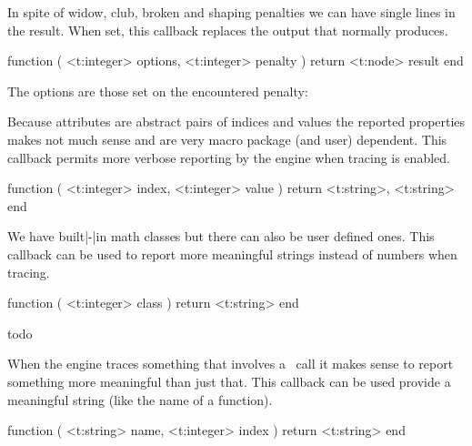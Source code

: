 \stopsubsection

\startsubsection[title=show_loners]

In spite of widow, club, broken and shaping penalties we can have single lines in the
result. When set, this callback replaces the output that normally \typ {\tracingloners}
produces.

\starttyping[option=LUA]
function (
    <t:integer> options,
    <t:integer> penalty
)
    return <t:node> result
end
\stoptyping

The options are those set on the encountered penalty:

\startcolumns[n=3]
\stopcolumns

\stopsubsection

\startsubsection[title=get_attribute]

Because attributes are abstract pairs of indices and values the reported
properties makes not much sense and are very macro package (and user) dependent.
This callback permits more verbose reporting by the engine when tracing is
enabled.

\starttyping[option=LUA]
function (
    <t:integer> index,
    <t:integer> value
)
    return <t:string>, <t:string>
end
\stoptyping

\stopsubsection

\startsubsection[title=get_noad_class]

We have built|-|in math classes but there can also be user defined ones. This
callback can be used to report more meaningful strings instead of numbers when
tracing.

\starttyping[option=LUA]
function (
    <t:integer> class
)
    return <t:string>
end
\stoptyping


\stopsubsection

\startsubsection[title=get_math_dictionary]
    todo
\stopsubsection

\startsubsection[title=show_lua_call]

When the engine traces something that involves a \LUA\ call it makes sense to report something
more meaningful than just that. This callback can be used provide a meaningful string (like the
name of a function).

\starttyping[option=LUA]
function (
    <t:string>  name,
    <t:integer> index
)
    return <t:string>
end
\stoptyping

\stopsubsection

\startsubsection[title=trace_memory]

